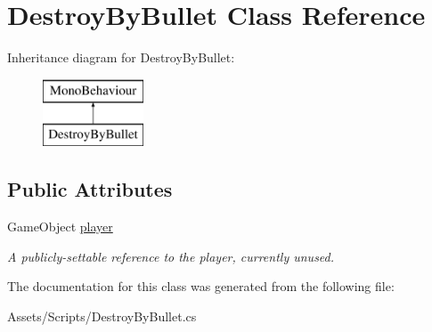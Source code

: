 \hypertarget{class_destroy_by_bullet}{}\section{Destroy\+By\+Bullet Class Reference}
\label{class_destroy_by_bullet}
Inheritance diagram for Destroy\+By\+Bullet\+:\begin{figure}[H]
\begin{center}
\leavevmode
\includegraphics[height=2.000000cm]{class_destroy_by_bullet}
\end{center}
\end{figure}
\subsection*{Public Attributes}
\begin{DoxyCompactItemize}
\item 
\mbox{\label{class_destroy_by_bullet_ac3225ab3c49d644840b85519aed90623}} 
Game\+Object \mbox{\hyperlink{class_destroy_by_bullet_ac3225ab3c49d644840b85519aed90623}{player}}
\begin{DoxyCompactList}\small\item\em A publicly-\/settable reference to the player, currently unused. \end{DoxyCompactList}\end{DoxyCompactItemize}


The documentation for this class was generated from the following file\+:\begin{DoxyCompactItemize}
\item 
Assets/\+Scripts/Destroy\+By\+Bullet.\+cs\end{DoxyCompactItemize}
